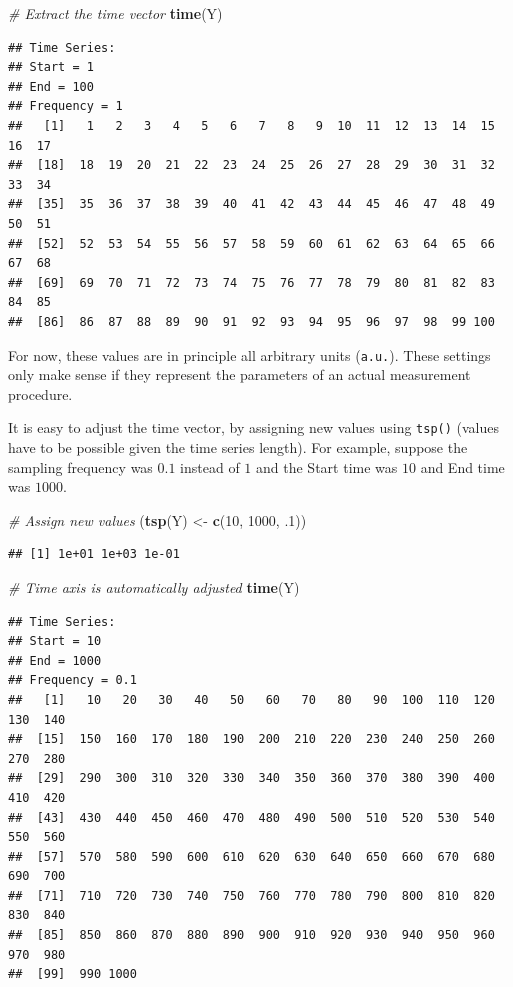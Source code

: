 \documentclass[12pt,]{book}
\newenvironment{Shaded}{\begin{snugshade}}{\end{snugshade}}
\newcommand{\CommentTok}[1]{\textcolor[rgb]{0.56,0.35,0.01}{\textit{#1}}}
\newcommand{\DecValTok}[1]{\textcolor[rgb]{0.00,0.00,0.81}{#1}}
\newcommand{\FloatTok}[1]{\textcolor[rgb]{0.00,0.00,0.81}{#1}}
\newcommand{\KeywordTok}[1]{\textcolor[rgb]{0.13,0.29,0.53}{\textbf{#1}}}
\newcommand{\NormalTok}[1]{#1}
\newcommand{\StringTok}[1]{\textcolor[rgb]{0.31,0.60,0.02}{#1}}
\begin{document}
\begin{Shaded}
\begin{Highlighting}[]
\CommentTok{# Extract the time vector}
\KeywordTok{time}\NormalTok{(Y)}
\end{Highlighting}
\end{Shaded}

\begin{verbatim}
## Time Series:
## Start = 1 
## End = 100 
## Frequency = 1 
##   [1]   1   2   3   4   5   6   7   8   9  10  11  12  13  14  15  16  17
##  [18]  18  19  20  21  22  23  24  25  26  27  28  29  30  31  32  33  34
##  [35]  35  36  37  38  39  40  41  42  43  44  45  46  47  48  49  50  51
##  [52]  52  53  54  55  56  57  58  59  60  61  62  63  64  65  66  67  68
##  [69]  69  70  71  72  73  74  75  76  77  78  79  80  81  82  83  84  85
##  [86]  86  87  88  89  90  91  92  93  94  95  96  97  98  99 100
\end{verbatim}

For now, these values are in principle all arbitrary units (\texttt{a.u.}). These settings only make sense if they represent the parameters of an actual measurement procedure.

It is easy to adjust the time vector, by assigning new values using \texttt{tsp()} (values have to be possible given the time series length). For example, suppose the sampling frequency was \(0.1\) instead of \(1\) and the Start time was \(10\) and End time was \(1000\).

\begin{Shaded}
\begin{Highlighting}[]
\CommentTok{# Assign new values}
\NormalTok{(}\KeywordTok{tsp}\NormalTok{(Y) <-}\StringTok{ }\KeywordTok{c}\NormalTok{(}\DecValTok{10}\NormalTok{, }\DecValTok{1000}\NormalTok{, }\FloatTok{.1}\NormalTok{))}
\end{Highlighting}
\end{Shaded}

\begin{verbatim}
## [1] 1e+01 1e+03 1e-01
\end{verbatim}

\begin{Shaded}
\begin{Highlighting}[]
\CommentTok{# Time axis is automatically adjusted }
\KeywordTok{time}\NormalTok{(Y)}
\end{Highlighting}
\end{Shaded}

\begin{verbatim}
## Time Series:
## Start = 10 
## End = 1000 
## Frequency = 0.1 
##   [1]   10   20   30   40   50   60   70   80   90  100  110  120  130  140
##  [15]  150  160  170  180  190  200  210  220  230  240  250  260  270  280
##  [29]  290  300  310  320  330  340  350  360  370  380  390  400  410  420
##  [43]  430  440  450  460  470  480  490  500  510  520  530  540  550  560
##  [57]  570  580  590  600  610  620  630  640  650  660  670  680  690  700
##  [71]  710  720  730  740  750  760  770  780  790  800  810  820  830  840
##  [85]  850  860  870  880  890  900  910  920  930  940  950  960  970  980
##  [99]  990 1000
\end{verbatim}
\end{document}
